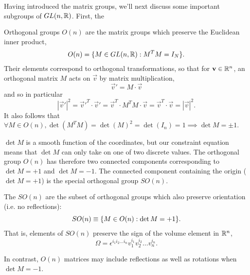 Having introduced the matrix groups, we'll next discuss some important subgroups of $GL(n,\mathbb{R})$. First, the 
\begin{defn}
Orthogonal groups $O(n)$ are the matrix groups which preserve the Euclidean inner product,
\begin{equation}
O(n)=\{M\in GL(n,\mathbb{R}): M^T M = I_N\}.
\end{equation}
Their elements correspond to orthogonal transformations, so that for $\boldsymbol{\mathbf{v}}\in \mathbb{R}^n$, an orthogonal matrix $M$ acts on $\vec{v}$ by matrix multiplication,
$$\vec{v}'=M\cdot \vec{v}$$
and so in particular
$$|\vec{v}'|^2={\vec{v}'}^T \cdot \vec{v}' = \vec{v}^T \cdot M^T M \cdot \vec{v}= \vec{v}^T \cdot \vec{v}=|\vec{v}|^2.$$
It also follows that $\forall M\in O(n), \det(M^TM)=\det(M)^2 = \det(I_n) = 1 \implies \det M =\pm 1$.
\end{defn}
$\det M$ is a smooth function of the coordinates, but our constraint equation means that $\det M$ can only take on one of two discrete values. The orthogonal group $O(n)$ has therefore two connected components corresponding to $\det M = +1$ and $\det M = -1$. The connected component containing the origin ($\det M = +1$) is the special orthogonal group $SO(n)$.
\begin{defn}
The  $SO(n)$ are the subset of orthogonal groups which also preserve orientation (i.e. no reflections):
$$SO(n)\equiv \{M\in O(n): \det M = +1\}.$$
That is, elements of $SO(n)$ preserve the sign of the volume element in $\mathbb{R}^n$,
$$\Omega= \epsilon^{i_1 i_2 \ldots i_n} v_1^{i_1}v_2^{i_2}\ldots v_n^{i_n}.$$
\end{defn}
In contrast, $O(n)$ matrices may include reflections as well as rotations when $\det M = -1$.

